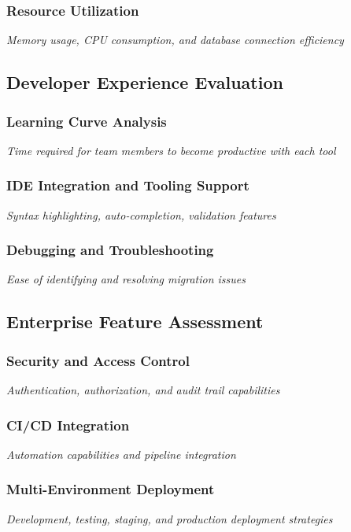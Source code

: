 \documentclass[11pt,a4paper]{article}
\begin{document}
\subsubsection{Resource Utilization}
\textit{Memory usage, CPU consumption, and database connection efficiency}

\subsection{Developer Experience Evaluation}

\subsubsection{Learning Curve Analysis}
\textit{Time required for team members to become productive with each tool}

\subsubsection{IDE Integration and Tooling Support}
\textit{Syntax highlighting, auto-completion, validation features}

\subsubsection{Debugging and Troubleshooting}
\textit{Ease of identifying and resolving migration issues}

\subsection{Enterprise Feature Assessment}

\subsubsection{Security and Access Control}
\textit{Authentication, authorization, and audit trail capabilities}

\subsubsection{CI/CD Integration}
\textit{Automation capabilities and pipeline integration}

\subsubsection{Multi-Environment Deployment}
\textit{Development, testing, staging, and production deployment strategies}
\end{document}
